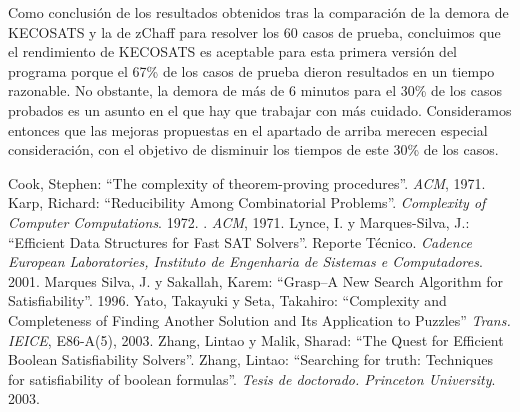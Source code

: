 \documentclass[12pt,lettersize,oneside]{article}
\begin{document}
Como conclusión de los resultados obtenidos tras la comparación de la demora de
KECOSATS y la de zChaff para resolver los 60 casos de prueba, concluimos que el
rendimiento de KECOSATS es aceptable para esta primera versión del programa
porque el 67\% de los casos de prueba dieron resultados en un tiempo
razonable. No obstante, la demora de más de 6 minutos para el 30\% de los casos
probados es un asunto en el que hay que trabajar con más cuidado. Consideramos
entonces que las mejoras propuestas en el apartado de arriba merecen especial
consideración, con el objetivo de disminuir los tiempos de este 30\% de los
casos.

\begin{thebibliography}{99}
Cook, Stephen: ``The complexity of theorem-proving
  procedures''. \emph{ACM}, 1971.
Karp, Richard: ``Reducibility Among Combinatorial
  Problems''. \emph{Complexity of Computer Computations}. 1972.
  . \emph{ACM}, 1971.
Lynce, I. y Marques-Silva, J.: ``Efficient Data Structures for
  Fast SAT Solvers''. Reporte Técnico. \emph{Cadence European Laboratories,
    Instituto de Engenharia de Sistemas e Computadores}. 2001.
Marques Silva, J. y Sakallah, Karem: ``Grasp--A New Search
  Algorithm for Satisfiability''. 1996.
Yato, Takayuki y Seta, Takahiro: ``Complexity and Completeness
  of Finding Another Solution and Its Application to Puzzles''  \emph{Trans. IEICE}, E86-A(5), 2003.
Zhang, Lintao y Malik, Sharad: ``The Quest for Efficient Boolean
  Satisfiability Solvers''.
Zhang, Lintao: ``Searching for truth: Techniques for
  satisfiability of boolean formulas''. \emph{Tesis de doctorado. Princeton
    University}. 2003.
\end{thebibliography}
\end{document}
